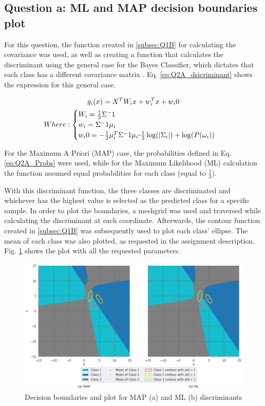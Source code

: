 \documentclass{article}
\def\-{\raisebox{.75pt}{-}}
\begin{document}
\subsection{Question a: ML and MAP decision boundaries plot}
\label{subsec:Q2A}
For this question, the function created in \ref{subsec:Q1B} for calculating the covariance was used, as well as creating a function that calculates the discriminant using the general case for the Bayes Classifier, which dictates that each class has a different covariance matrix \cite{Bayes_Classifier}. Eq. \ref{eq:Q2A_dsicriminant} shows the expression for this general case.

\begin{gather}\label{eq:Q2A_dsicriminant}
    g_i (x) = X^T W_i x + w_i^T x + w_i0\\
    \notag Where:
    \begin{cases}
      W_i = \tfrac{1}{2} \Sigma^-1\\
      w_i = \Sigma^-1 \mu_i\\
      w_i0 = -\tfrac{1}{2} \mu_i^T \Sigma^-1 \mu_i \- \tfrac{1}{2}  \log(\abs{\Sigma_i}) + \log(P(\omega_i))
    \end{cases}
\end{gather}

For the Maximum A Priori (MAP) case, the probabilities defined in Eq. \ref{eq:Q2A_Probs} were used, while for the Maximum Likelihood (ML) calculation the function assumed equal probabilities for each class (equal to $\tfrac{1}{3}$).

With this discriminant function, the three classes are discriminated and whichever has the highest value is selected as the predicted class for a specific sample. In order to plot the boundaries, a meshgrid\cite{Numpy_Meshgrid} was used and traversed while calculating the discriminant at each coordinate. Afterwards, the contour function created in \ref{subsec:Q1B} was subsequently used to plot each class' ellipse. The mean of each class was also plotted, as requested in the assignment description. Fig. \ref{fig:Q2A_plot} shows the plot with all the requested parameters.

\begin{figure}[tb]
    \centering
    \includegraphics[width=\linewidth]{Img/Q2A.png}
    \caption{Decision boundaries and plot for MAP (a) and ML (b) discriminants}
    \label{fig:Q2A_plot}
\end{figure}
\end{document}
